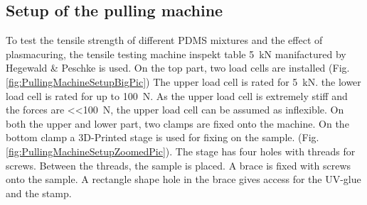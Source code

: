 \subsection{Setup of the pulling machine}

To test the tensile strength of different PDMS mixtures and the effect of plasmacuring, the tensile testing machine inspekt table \SI{5}{\kilo\newton} manifactured by Hegewald \& Peschke is used. On the top part, two load cells are installed (Fig. \ref{fig:PullingMachineSetupBigPic}) The upper load cell is rated for \SI{5}{\kilo\newton}. the lower load cell is rated for up to \SI{100}{\newton}. As the upper load cell is extremely stiff and the forces are \SI{<<100}{\newton}, the upper load cell can be assumed as inflexible. On both the upper and lower part, two clamps are fixed onto the machine. On the bottom clamp a 3D-Printed stage is used for fixing on the sample. (Fig. \ref{fig:PullingMachineSetupZoomedPic}). The stage has four holes with threads for screws. Between the threads, the sample is placed. A brace is fixed with screws onto the sample. A rectangle shape hole in the brace gives access for the UV-glue and the stamp. 



